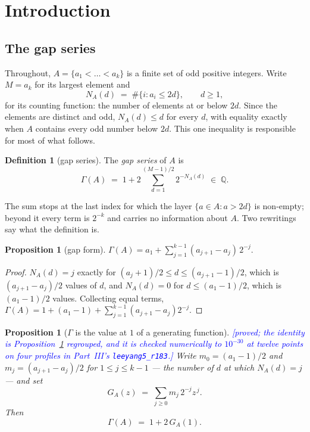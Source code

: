 \documentclass[11pt,a4paper]{article}
\theoremstyle{plain}
\newtheorem{proposition}[theorem]{Proposition}
\theoremstyle{definition}
\newtheorem{definition}[theorem]{Definition}
\theoremstyle{remark}
\newcommand{\STATUS}[1]{\textcolor{blue}{\textsf{[#1]}}}
\begin{document}
\tableofcontents

\section{Introduction}

\subsection{The gap series}

Throughout, $A=\{a_1<\dots<a_k\}$ is a finite set of odd positive integers. Write
$M=a_k$ for its largest element and
\[
  N_A(d)\;=\;\#\{i:a_i\le 2d\},\qquad d\ge1,
\]
for its counting function: the number of elements at or below $2d$. Since the
elements are distinct and odd, $N_A(d)\le d$ for every $d$, with equality
exactly when $A$ contains every odd number below $2d$. This one inequality is
responsible for most of what follows.

\begin{definition}[gap series]\label{def:gap}
The \emph{gap series} of $A$ is
\[
  \Gamma(A)\;=\;1+2\sum_{d=1}^{(M-1)/2}2^{-N_A(d)}\;\in\;\mathbb{Q}.
\]
\end{definition}

The sum stops at the last index for which the layer $\{a\in A:a>2d\}$ is
non-empty; beyond it every term is $2^{-k}$ and carries no information about
$A$. Two rewritings say what the definition is.

\begin{proposition}[gap form]\label{prop:gapform}
$\displaystyle\Gamma(A)=a_1+\sum_{j=1}^{k-1}(a_{j+1}-a_j)\,2^{-j}.$
\end{proposition}

\begin{proof}
$N_A(d)=j$ exactly for $(a_j+1)/2\le d\le(a_{j+1}-1)/2$, which is
$(a_{j+1}-a_j)/2$ values of $d$, and $N_A(d)=0$ for $d\le(a_1-1)/2$, which is
$(a_1-1)/2$ values. Collecting equal terms,
$\Gamma(A)=1+(a_1-1)+\sum_{j=1}^{k-1}(a_{j+1}-a_j)2^{-j}$.
\end{proof}

\begin{proposition}[$\Gamma$ is the value at $1$ of a generating function]\label{prop:gengamma}
\STATUS{proved; the identity is Proposition~\ref{prop:gapform} regrouped, and it is checked
numerically to $10^{-30}$ at twelve points on four profiles in Part~III's
\texttt{leeyang5\_r183}.}
Write $m_0=(a_1-1)/2$ and $m_j=(a_{j+1}-a_j)/2$ for $1\le j\le k-1$ --- the number of $d$ at
which $N_A(d)=j$ --- and set
\[
  G_A(z)\;=\;\sum_{j\ge0}m_j\,2^{-j}z^{\,j}.
\]
Then
\[
  \Gamma(A)\;=\;1+2\,G_A(1).
\]
\end{proposition}
\end{document}
